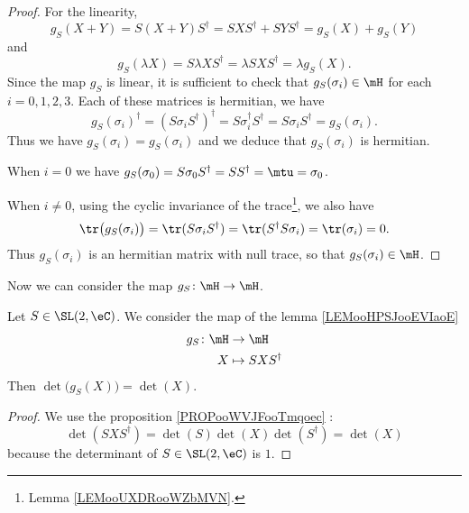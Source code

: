 \begin{proof}
    For the linearity,
    \begin{equation}
        g_S(X+Y)=S(X+Y)S^{\dag}=SXS^{\dag}+SYS^{\dag}=g_S(X)+g_S(Y)
    \end{equation}
    and
    \begin{equation}
        g_S(\lambda X)=S\lambda XS^{\dag}=\lambda SXS^{\dag}=\lambda g_S(X).
    \end{equation}
    Since the map \( g_S\) is linear, it is sufficient to check that \( g_S(\sigma_i)\in \mH\) for each \( i=0,1,2,3\). Each of these matrices is hermitian, we have
    \begin{equation}
        g_S(\sigma_i)^{\dag}=(S\sigma_iS^{\dag})^{\dag}=S\sigma_i^{\dag}S^{\dag}=S\sigma_iS^{\dag}=g_S(\sigma_i).
    \end{equation}
    Thus we have \( g_S(\sigma_i)=g_S(\sigma_i)\) and we deduce that \( g_S(\sigma_i)\) is hermitian.

    When \( i=0\) we have \( g_S(\sigma_0)=S\sigma_0S^{\dag}=SS^{\dag}=\mtu=\sigma_0\).

    When \( i\neq 0\), using the cyclic invariance of the trace\footnote{Lemma \ref{LEMooUXDRooWZbMVN}.}, we also have
    \begin{equation}
        \tr\big( g_S(\sigma_i) \big)=\tr(S\sigma_i S^{\dag})=\tr(S^{\dag}S\sigma_i)=\tr(\sigma_i)=0.
    \end{equation}
    Thus \( g_S(\sigma_i)\) is an hermitian matrix with null trace, so that \( g_S(\sigma_i)\in \mH\).
\end{proof}

Now we can consider the map \( g_S\colon \mH\to \mH\).

\begin{lemma}       \label{LEMooEDIMooNIURdn}
    Let \( S\in \SL(2,\eC)\). We consider the map of the lemma \ref{LEMooHPSJooEVIaoE}
    \begin{equation}
        \begin{aligned}
            g_S\colon \mH&\to \mH \\
            X&\mapsto SXS^{\dag}
        \end{aligned}
    \end{equation}
    Then \( \det\big( g_S(X) \big)=\det(X)\).
\end{lemma}

\begin{proof}
    We use the proposition \ref{PROPooWVJFooTmqoec} :
    \begin{equation}
        \det(SXS^{\dag})=\det(S)\det(X)\det(S^{\dag})=\det(X)
    \end{equation}
    because the determinant of \( S\in\SL(2,\eC)\) is \( 1\).
\end{proof}


